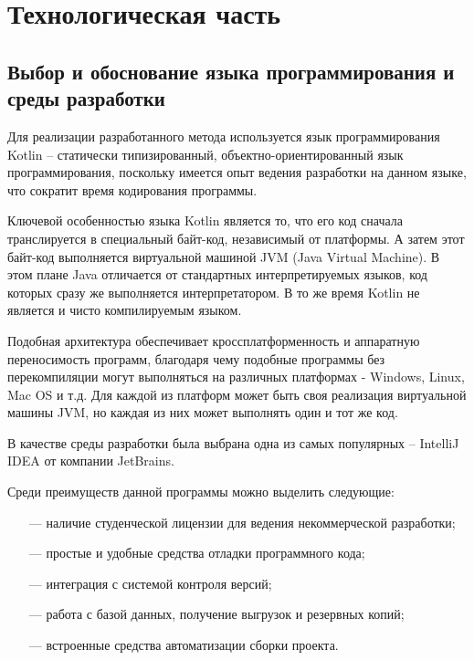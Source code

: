 \section{Технологическая часть}

\subsection{Выбор и обоснование языка программирования и среды разработки}

Для реализации разработанного метода используется язык программирования Kotlin – статически типизированный, объектно-ориентированный язык программирования\cite{Kotlin}, поскольку имеется опыт ведения разработки на данном языке, что сократит время кодирования программы. 

Ключевой особенностью языка Kotlin является то, что его код сначала транслируется в специальный байт-код, независимый от платформы. А затем этот байт-код выполняется виртуальной машиной JVM (Java Virtual Machine). В этом плане Java отличается от стандартных интерпретируемых языков, код которых сразу же выполняется интерпретатором. В то же время Kotlin не является и чисто компилируемым языком.

Подобная архитектура обеспечивает кроссплатформенность и аппаратную переносимость программ, благодаря чему подобные программы без перекомпиляции могут выполняться на различных платформах - Windows, Linux, Mac OS и т.д. Для каждой из платформ может быть своя реализация виртуальной машины JVM, но каждая из них может выполнять один и тот же код.

В качестве среды разработки была выбрана одна из самых популярных – IntelliJ IDEA от компании JetBrains\cite{idea}.

Среди преимуществ данной программы можно выделить следующие:

\begin{itemize}[leftmargin=1.6\parindent]
	\item[---] наличие студенческой лицензии для ведения некоммерческой разработки;
	\item[---] простые и удобные средства отладки программного кода;
	\item[---] интеграция с системой контроля версий;
	\item[---] работа с базой данных, получение выгрузок и резервных копий;
	\item[---] встроенные средства автоматизации сборки проекта.
	
\end{itemize}

